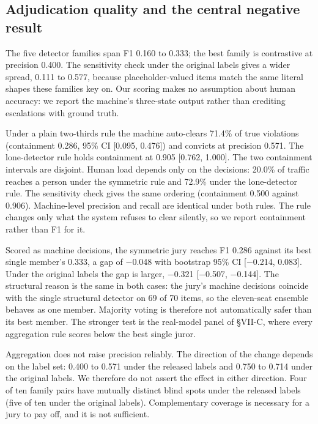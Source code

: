 \documentclass[conference]{IEEEtran}
\begin{document}
\subsection{Adjudication quality and the central negative result}

The five detector families span F1 0.160 to 0.333; the best family is contrastive at precision 0.400. The sensitivity check under the original labels gives a wider spread, 0.111 to 0.577, because placeholder-valued items match the same literal shapes these families key on. Our scoring makes no assumption about human accuracy: we report the machine's three-state output rather than crediting escalations with ground truth.

Under a plain two-thirds rule the machine auto-clears 71.4\% of true violations (containment 0.286, 95\% CI [0.095, 0.476]) and convicts at precision 0.571. The lone-detector rule holds containment at 0.905 [0.762, 1.000]. The two containment intervals are disjoint. Human load depends only on the decisions: 20.0\% of traffic reaches a person under the symmetric rule and 72.9\% under the lone-detector rule. The sensitivity check gives the same ordering (containment 0.500 against 0.906). Machine-level precision and recall are identical under both rules. The rule changes only what the system refuses to clear silently, so we report containment rather than F1 for it.

Scored as machine decisions, the symmetric jury reaches F1 0.286 against its best single member's 0.333, a gap of $-$0.048 with bootstrap 95\% CI [$-$0.214, 0.083]. Under the original labels the gap is larger, $-$0.321 [$-$0.507, $-$0.144]. The structural reason is the same in both cases: the jury's machine decisions coincide with the single structural detector on 69 of 70 items, so the eleven-seat ensemble behaves as one member. Majority voting is therefore not automatically safer than its best member. The stronger test is the real-model panel of \S{}VII-C, where every aggregation rule scores below the best single juror.

Aggregation does not raise precision reliably. The direction of the change depends on the label set: 0.400 to 0.571 under the released labels and 0.750 to 0.714 under the original labels. We therefore do not assert the effect in either direction. Four of ten family pairs have mutually distinct blind spots under the released labels (five of ten under the original labels). Complementary coverage is necessary for a jury to pay off, and it is not sufficient.
\end{document}
